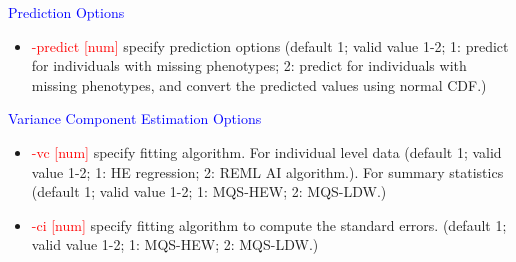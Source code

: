 \documentclass[11pt]{article}
\begin{document}
%
\textcolor{blue}{Prediction Options}
%
\begin{itemize}
\item  \textcolor{red}{-predict       [num]}     \quad          specify prediction options (default 1; valid value 1-2; 1: predict for individuals with missing phenotypes; 2: predict for individuals with missing phenotypes, and convert the predicted values using normal CDF.)
\end{itemize}
%
\textcolor{blue}{Variance Component Estimation Options}
%
\begin{itemize}
\item  \textcolor{red}{-vc       [num]}     \quad          specify fitting algorithm. For individual level data (default 1; valid value 1-2; 1: HE regression; 2: REML AI algorithm.). For summary statistics (default 1; valid value 1-2; 1: MQS-HEW; 2: MQS-LDW.)
\item  \textcolor{red}{-ci       [num]}     \quad          specify fitting algorithm to compute the standard errors. (default 1; valid value 1-2; 1: MQS-HEW; 2: MQS-LDW.)
\end{itemize}
%
	
\clearpage


\end{document}
